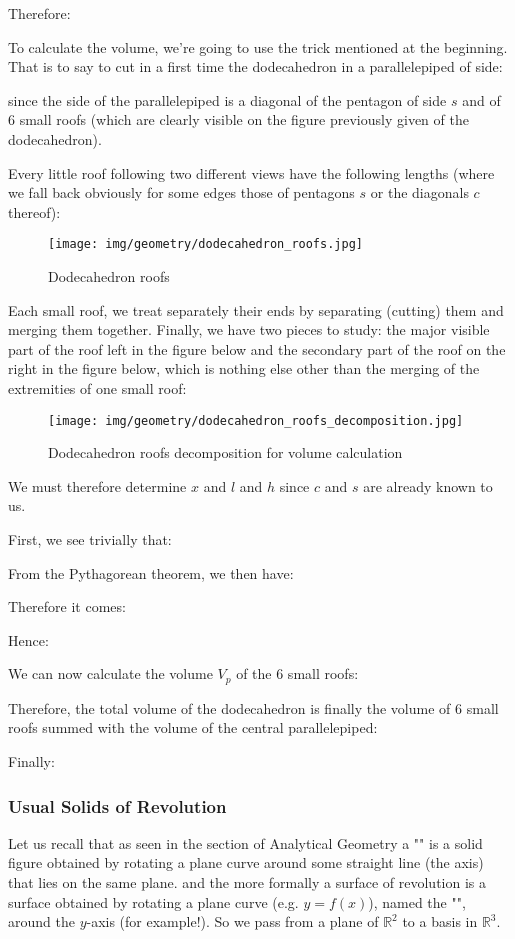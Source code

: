 {	Therefore:
	
	To calculate the volume, we're going to use the trick mentioned at the beginning. That is to say to cut in a first time the dodecahedron in a parallelepiped of side:
	
	since the side of the parallelepiped is a diagonal of the pentagon of side $s$ and of $6$ small roofs (which are clearly visible on the figure previously given of the dodecahedron).
	
	Every little roof following two different views have the following lengths (where we fall back obviously for some edges those of pentagons $s$ or the diagonals $c$ thereof): 
	\begin{figure}[H]
		\centering
		\texttt{[image: img/geometry/dodecahedron\_roofs.jpg]}
		\caption[]{Dodecahedron roofs}
	\end{figure}
	Each small roof, we treat separately their ends by separating (cutting) them and merging them together. Finally, we have two pieces to study: the major visible part of the roof left in the figure below and the secondary part of the roof on the right in the figure below, which is nothing else other than the merging of the extremities of one small roof:
	\begin{figure}[H]
		\centering
		\texttt{[image: img/geometry/dodecahedron\_roofs\_decomposition.jpg]}
		\caption[]{Dodecahedron roofs decomposition for volume calculation}
	\end{figure}
	We must therefore determine $x$ and $l$ and $h$ since $c$ and $s$ are already known to us.

	First, we see trivially that:
	
	From the Pythagorean theorem, we then have:
	
	Therefore it comes:
	
	Hence:
	
	We can now calculate the volume $V_p$ of the $6$ small roofs:
	
	Therefore, the total volume of the dodecahedron is finally the volume of $6$ small roofs summed with the volume of the central parallelepiped:
	
	Finally:
	
	
	\subsubsection{Usual Solids of Revolution}
	Let us recall that as seen in the section of Analytical Geometry a "\label{solid of revolution}" is a solid figure obtained by rotating a plane curve around some straight line (the axis) that lies on the same plane. and the more formally a surface of revolution is a surface obtained by rotating a plane curve (e.g. $y=f(x)$), named the "", around the $y$-axis (for example!). So we pass from a plane of $\mathbb{R}^2$ to a basis in $\mathbb{R}^3$.
	
}

